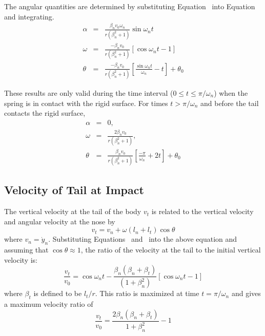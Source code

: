The angular quantities are determined by substituting 
Equation~ into Equation~ and integrating.
\begin{eqnarray}
\alpha & = & \frac{\beta_n v_0\omega_n}{r(\beta_n^2+1)}\sin\omega_n t\\
\omega & = & \frac{-\beta_n v_0}{r(\beta_n^2+1)}[\cos\omega_n t - 1]
               \label{eq:omega}\\
\theta & = & \frac{-\beta_n v_0}{r(\beta_n^2+1)}
                \left[\frac{\sin\omega_n t}{\omega_n} - t\right] + \theta_0
\label{etheta}
\end{eqnarray}

These results are only valid during the time interval ($0\leq t\leq
\pi / \omega_n$) when the spring is in contact with the rigid surface.
For times $t>\pi/\omega_n$ and before the tail contacts the rigid 
surface, 
\begin{eqnarray}
\alpha & = & 0, \\
\omega & = & \frac{2\beta_n v_0}{r(\beta_n^2+1)},\\
\theta & = & \frac{\beta_n v_0}{r(\beta_n^2+1)}\left[\frac{-\pi}{\omega_n}
      + 2t\right] + \theta_0\label{e12}
\end{eqnarray}

\subsection{Velocity of Tail at Impact}

The vertical velocity at the tail of the body $v_t$ is related to
the vertical velocity and angular velocity at the nose by 
\begin{equation}
v_t = v_n + \omega(l_n + l_t)\cos\theta
\end{equation}
where $v_n = \dot y_n$. 
Substituting Equations~ and~ into the above
equation and assuming that $\cos\theta\approx 1$, the ratio of the velocity
at the tail to the initial vertical velocity is:
\begin{equation}
\frac{v_t}{v_0} = \cos\omega_nt - \frac{\beta_n(\beta_n+\beta_t)}
{(1+\beta_n^2)}\left[\cos\omega_n t-1\right]\label{eq:vrv0t}
\end{equation}
where $\beta_t$ is defined to be $l_t/r$. This ratio is maximized at
time $t = \pi/\omega_n$ and gives a maximum velocity ratio of 
\begin{equation}
\frac{v_t}{v_0} = \frac{2\beta_n(\beta_n+\beta_t)}{1+\beta_n^2} - 1
\label{eq:vrv0}
\end{equation}

